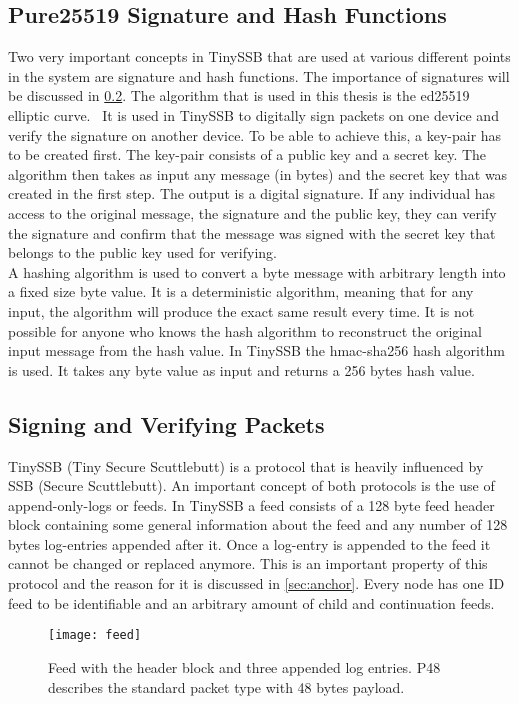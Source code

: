 \subsection{Pure25519 Signature and Hash Functions}
Two very important concepts in TinySSB that are used at various different points in the system are signature and hash functions. The importance of signatures will be discussed in \cref{sec:signing}. The algorithm that is used in this thesis is the ed25519 elliptic curve.~\cite{9519456} It is used in TinySSB to digitally sign packets on one device and verify the signature on another device. To be able to achieve this, a key-pair has to be created first. The key-pair consists of a public key and a secret key. The algorithm then takes as input any message (in bytes) and the secret key that was created in the first step. The output is a digital signature. If any individual has access to the original message, the signature and the public key, they can verify the signature and confirm that the message was signed with the secret key that belongs to the public key used for verifying. \\
A hashing algorithm is used to convert a byte message with arbitrary length into a fixed size byte value. It is a deterministic algorithm, meaning that for any input, the algorithm will produce the exact same result every time. It is not possible for anyone who knows the hash algorithm to reconstruct the original input message from the hash value. 
In TinySSB the hmac-sha256 hash algorithm is used. It takes any byte value as input and returns a 256 bytes hash value.~\cite{Kelly2007UsingHH}

\subsection{Signing and Verifying Packets}
\label{sec:signing}
TinySSB (Tiny Secure Scuttlebutt) is a protocol that is heavily influenced by SSB (Secure Scuttlebutt). An important concept of both protocols is the use of append-only-logs or feeds. In TinySSB a feed consists of a 128 byte feed header block containing some general information about the feed and any number of 128 bytes log-entries appended after it. Once a log-entry is appended to the feed it cannot be changed or replaced anymore. This is an important property of this protocol and the reason for it is discussed in \cref{sec:anchor}. Every node has one ID feed to be identifiable and an arbitrary amount of child and continuation feeds.
\begin{figure}
\centering
\texttt{[image: feed]}
\caption{Feed with the header block and three appended log entries. P48 describes the standard packet type with 48 bytes payload.}
\label{fig:feed}
\end{figure}

